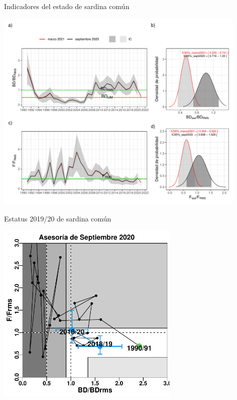 \documentclass[
  ignorenonframetext,
]{beamer}
\begin{document}
\begin{frame}{Indicadores del estado de sardina común}
\protect\hypertarget{indicadores-del-estado-de-sardina-comuxfan}{}
\begin{center}
\includegraphics[width=0.9\textwidth]{FigurasInforme_Marzo/F39_indicadoresStock-1.pdf}
\end{center}
\end{frame}

\begin{frame}{Estatus 2019/20 de sardina común}
\protect\hypertarget{estatus-201920-de-sardina-comuxfan}{}
\begin{center}
\includegraphics[width=0.65\textwidth]{FigurasInforme_Marzo/Fig40_DFsept-1.pdf}
\end{center}
\end{frame}
\end{document}
